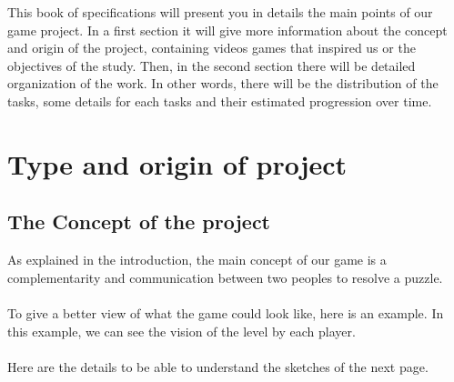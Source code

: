 \documentclass[12pt]{article}
\begin{document}
This book of specifications will present you in details the main points of our game project. In a first section it will give more information about the concept and origin of the project, containing videos games that inspired us or the objectives of the study. Then, in the second section there will be detailed organization of the work. In other words, there will be the distribution of the tasks, some details for each tasks and their estimated progression over time.\\

\newpage

\section{Type and origin of project}

	\subsection{The Concept of the project}
		As explained in the introduction, the main concept of our game is a complementarity and communication between two peoples to resolve a puzzle.
        \paragraph*{} To give a better view of what the game could look like, here is an example. In this example, we can see the vision of the level by each player.\\
        \paragraph*{} Here are the details to be able to understand the sketches of the next page.
        
\end{document}
